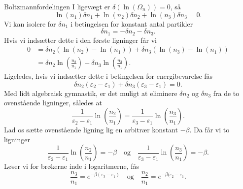 \begin{opgave}{Boltzmannfordelingen}
    \opg I ligevægt er $\delta(\ln(\Omega_n))=0$, så
    \[ \ln(n_1)\delta n_1+\ln(n_2)\delta n_2+\ln(n_3)\delta n_3=0. \]
    Vi kan isolere for $\delta n_1$ i betingelsen for konstant antal partikler
    \[ \delta n_1=-\delta n_2-\delta n_3. \]
    Hvis vi indsætter dette i den første ligninger får vi
    \begin{align*}
        0&=\delta n_2\left(\ln(n_2)-\ln(n_1)\right)+\delta n_3\left(\ln(n_3)-\ln(n_1)\right)\\
        &=\delta n_2\ln\left(\frac{n_2}{n_1}\right)+\delta n_3\ln\left(\frac{n_3}{n_1}\right).
    \end{align*}
    Ligeledes, hvis vi indsætter dette i betingelsen for energibevarelse fås
    \[ \delta n_2(\varepsilon_2-\varepsilon_1)+\delta n_3(\varepsilon_3-\varepsilon_1)=0. \]
    Med lidt algebraisk gymnastik, er det muligt at eliminere $\delta n_2$ og $\delta n_3$ fra de to ovenstående ligninger, således at
    \[ \frac{1}{\varepsilon_2-\varepsilon_1}\ln\left(\frac{n_2}{n_1}\right)=\frac{1}{\varepsilon_3-\varepsilon_1}\ln\left(\frac{n_3}{n_1}\right). \]
    \opg Lad os sætte ovenstående ligning lig en arbitrær konstant $-\beta$. Da får vi to ligninger
    \[ \frac{1}{\varepsilon_2-\varepsilon_1}\ln\left(\frac{n_2}{n_1}\right)=-\beta\quad\text{og}\quad\frac{1}{\varepsilon_3-\varepsilon_1}\ln\left(\frac{n_3}{n_1}\right)=-\beta. \]
    Løser vi for brøkerne inde i logaritmerne, fås
    \[ \frac{n_3}{n_1}=e^{-\beta(\varepsilon_3-\varepsilon_1)}\quad\text{og}\quad\frac{n_2}{n_1}=e^{-\beta(\varepsilon_2-\varepsilon_1}. \]
\end{opgave}

